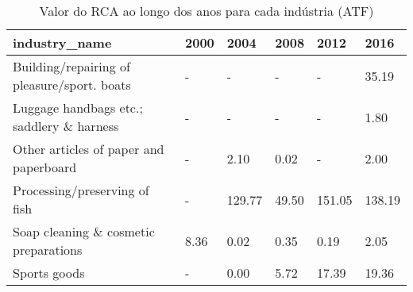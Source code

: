 \begin{table}
\centering
\caption{Valor do RCA ao longo dos anos para cada indústria (ATF)}
\begin{tabular}{p{6cm}p{1.5cm}p{1.5cm}p{1.5cm}p{1.5cm}p{1.5cm}}
\toprule
                              industry\_name & 2000 &   2004 &  2008 &   2012 &   2016 \\
\midrule
Building/repairing of pleasure/sport. boats &    - &      - &     - &      - &  35.19 \\
  Luggage handbags etc.; saddlery \& harness &    - &      - &     - &      - &   1.80 \\
     Other articles of paper and paperboard &    - &   2.10 &  0.02 &      - &   2.00 \\
              Processing/preserving of fish &    - & 129.77 & 49.50 & 151.05 & 138.19 \\
      Soap cleaning \& cosmetic preparations & 8.36 &   0.02 &  0.35 &   0.19 &   2.05 \\
                               Sports goods &    - &   0.00 &  5.72 &  17.39 &  19.36 \\
\bottomrule
\end{tabular}
\end{table}
